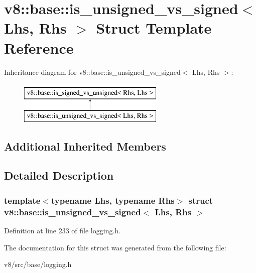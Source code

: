 \hypertarget{structv8_1_1base_1_1is__unsigned__vs__signed}{}\section{v8\+:\+:base\+:\+:is\+\_\+unsigned\+\_\+vs\+\_\+signed$<$ Lhs, Rhs $>$ Struct Template Reference}
\label{structv8_1_1base_1_1is__unsigned__vs__signed}
Inheritance diagram for v8\+:\+:base\+:\+:is\+\_\+unsigned\+\_\+vs\+\_\+signed$<$ Lhs, Rhs $>$\+:\begin{figure}[H]
\begin{center}
\leavevmode
\includegraphics[height=2.000000cm]{structv8_1_1base_1_1is__unsigned__vs__signed}
\end{center}
\end{figure}
\subsection*{Additional Inherited Members}


\subsection{Detailed Description}
\subsubsection*{template$<$typename Lhs, typename Rhs$>$\newline
struct v8\+::base\+::is\+\_\+unsigned\+\_\+vs\+\_\+signed$<$ Lhs, Rhs $>$}



Definition at line 233 of file logging.\+h.



The documentation for this struct was generated from the following file\+:\begin{DoxyCompactItemize}
\item 
v8/src/base/logging.\+h\end{DoxyCompactItemize}
